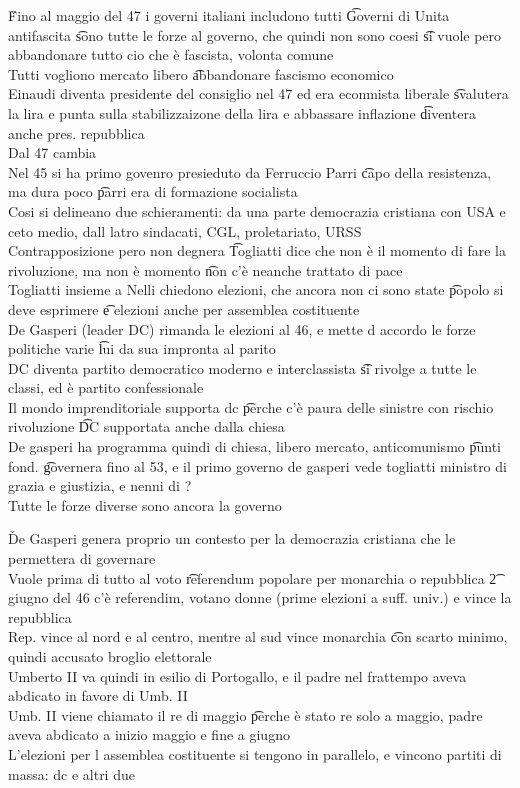 \documentclass[12pt]{article}
\begin{document}
\v

Fino al maggio del 47 i governi italiani includono tutti \t Governi di Unita antifascita \t sono tutte le forze al governo, che quindi non sono coesi \t si vuole pero abbandonare tutto cio che è fascista, volonta comune \\
Tutti vogliono mercato libero \t abbandonare fascismo economico \\
Einaudi diventa presidente del consiglio nel 47 ed era econmista liberale \t svalutera la lira e punta sulla stabilizzaizone della lira e abbassare inflazione \t diventera anche pres. repubblica \\
Dal 47 cambia \\
Nel 45 si ha primo govenro presieduto da Ferruccio Parri \t capo della resistenza, ma dura poco \t parri era di formazione socialista \\
Cosi si delineano due schieramenti: da una parte democrazia cristiana con USA e ceto medio, dall latro sindacati, CGL, proletariato, URSS \\
Contrapposizione pero non degnera \t Togliatti dice che non è il momento di fare la rivoluzione, ma non è momento \t non c'è neanche trattato di pace \\
Togliatti insieme a Nelli chiedono elezioni, che ancora non ci sono state \t popolo si deve esprimere \t e elezioni anche per assemblea costituente \\
De Gasperi (leader DC) rimanda le elezioni al 46, e mette d accordo le forze politiche varie \t lui da sua impronta al parito \\
DC diventa partito democratico moderno e interclassista \t si rivolge a tutte le classi, ed è partito confessionale \\
Il mondo imprenditoriale supporta dc \t perche c'è paura delle sinistre con rischio rivoluzione \t DC supportata anche dalla chiesa \\
De gasperi ha programma quindi di chiesa, libero mercato, anticomunismo \t punti fond. \t governera fino al 53, e il primo governo de gasperi vede togliatti ministro di grazia e giustizia, e nenni di ? \\
Tutte le forze diverse sono ancora la governo

\v

De Gasperi genera proprio un contesto per la democrazia cristiana che le permettera di governare \\
Vuole prima di tutto al voto \t referendum popolare per monarchia o repubblica \t 2 giugno del 46 c'è referendim, votano donne (prime elezioni a suff. univ.) e vince la repubblica \\
Rep. vince al nord e al centro, mentre al sud vince monarchia \t con scarto minimo, quindi accusato broglio elettorale \\
Umberto II va quindi in esilio di Portogallo, e il padre nel frattempo aveva abdicato in favore di Umb. II \\
Umb. II viene chiamato il re di maggio \t perche è stato re solo a maggio, padre aveva abdicato a inizio maggio e fine a giugno \\
L'elezioni per l assemblea costituente si tengono in parallelo, e vincono partiti di massa: dc e altri due
\end{document}
